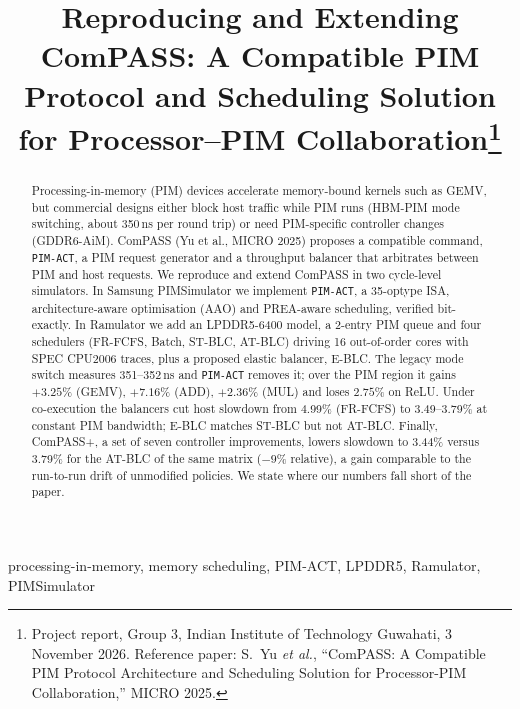 \documentclass[conference]{IEEEtran}
\newcommand{\cmd}[1]{\texttt{\footnotesize #1}}
\newcommand{\pimact}{\cmd{PIM-ACT}\xspace}
\begin{document}
\title{Reproducing and Extending ComPASS: A Compatible PIM Protocol and Scheduling Solution for Processor--PIM Collaboration\thanks{Project report, Group 3, Indian Institute of Technology Guwahati, 3 November 2026. Reference paper: S.~Yu \emph{et al.}, ``ComPASS: A Compatible PIM Protocol Architecture and Scheduling Solution for Processor-PIM Collaboration,'' MICRO 2025.}}
\author{%
\and
{}
\and
{}
\and
{}}
\maketitle

\begin{abstract}
Processing-in-memory (PIM) devices accelerate memory-bound kernels such as GEMV, but commercial designs either block host traffic while PIM runs (HBM-PIM mode switching, about 350\,ns per round trip) or need PIM-specific controller changes (GDDR6-AiM). ComPASS (Yu et al., MICRO 2025) proposes a compatible command, \pimact, a PIM request generator and a throughput balancer that arbitrates between PIM and host requests. We reproduce and extend ComPASS in two cycle-level simulators. In Samsung PIMSimulator we implement \pimact, a 35-optype ISA, architecture-aware optimisation (AAO) and PREA-aware scheduling, verified bit-exactly. In Ramulator we add an LPDDR5-6400 model, a 2-entry PIM queue and four schedulers (FR-FCFS, Batch, ST-BLC, AT-BLC) driving 16 out-of-order cores with SPEC CPU2006 traces, plus a proposed elastic balancer, E-BLC. The legacy mode switch measures 351--352\,ns and \pimact removes it; over the PIM region it gains $+3.25\%$ (GEMV), $+7.16\%$ (ADD), $+2.36\%$ (MUL) and loses $2.75\%$ on ReLU. Under co-execution the balancers cut host slowdown from 4.99\% (FR-FCFS) to 3.49--3.79\% at constant PIM bandwidth; E-BLC matches ST-BLC but not AT-BLC. Finally, ComPASS+, a set of seven controller improvements, lowers slowdown to 3.44\% versus 3.79\% for the AT-BLC of the same matrix ($-9\%$ relative), a gain comparable to the run-to-run drift of unmodified policies. We state where our numbers fall short of the paper.
\end{abstract}
\begin{IEEEkeywords}
processing-in-memory, memory scheduling, PIM-ACT, LPDDR5, Ramulator, PIMSimulator
\end{IEEEkeywords}
\end{document}
